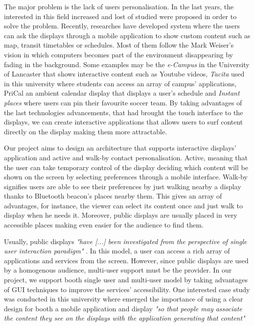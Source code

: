 \documentclass[]{usiinfbachelorproject}
\begin{document}
The major problem is the lack of users personalisation. In the last years, the interested in this field increased and lost of studied were proposed in order to solve the problem. Recently, researches have developed system where the users can ask the displays through a mobile application to show custom content such as map, transit timetables or schedules. Most of them follow the Mark Weiser's \cite{the_computer_for} vision in which computers becomes part of the environment disappearing by fading in the background.
Some examples may be the \emph{e-Campus} \cite{e_campus} in the University of Lancaster that shows interactive content such as Youtube videos, \emph{Tacita} used in this university where students can access an array of campus' applications, PriCal\cite{pri_cal} an ambient calendar display that displays a user's schedule and \emph{Instant places} \cite{pins_and_posters} where users can pin their favourite soccer team.
By taking advantages of the last technologies advancements, that had brought the touch interface to the displays, we can create interactive applications that allows users to surf content directly on the display making them more attractable.

Our project aims to design an architecture that supports interactive displays' application and active and walk-by contact personalisation. Active, meaning that the user can take temporary control of the display deciding which content will be shown on the screen by selecting preferences through a mobile interface. 
Walk-by signifies users are able to see their preferences by just walking nearby a display thanks to Bluetooth beacon's places nearby them. This gives an array of advantages, for instance, the viewer can select its content once and just walk to display when he needs it. Moreover, public displays are usually placed in very accessible places making even easier for the audience to find them. 

Usually, public displays  \emph{"have [...] been investigated from the perspective of single user
interaction paradigm"} \cite{personalisation_and_privacy}. In this model, a user can access a rich array of applications and services from the screen. However, since public displays are used by a homogenous audience, multi-user support must be the provider. In our project, we support booth single user and multi-user model by taking advantages of GUI techniques to improve the services' accessibility. One interested case study was conducted in this university \cite{design_considerations} where emerged the importance of using a clear design for booth a mobile application and display  \emph{"so that people may associate the content they see on the displays with the application generating that content"} \cite{design_considerations}
\end{document}
